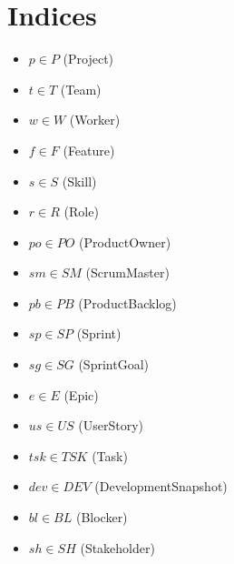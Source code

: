 \documentclass{article}
\begin{document}
\section{Indices}
\begin{itemize}
    \item $p \in P$ (Project)
    \item $t \in T$ (Team)
    \item $w \in W$ (Worker)
    \item $f \in F$ (Feature)
    \item $s \in S$ (Skill)
    \item $r \in R$ (Role)
    \item $po \in PO$ (ProductOwner)
    \item $sm \in SM$ (ScrumMaster)
    \item $pb \in PB$ (ProductBacklog)
    \item $sp \in SP$ (Sprint)
    \item $sg \in SG$ (SprintGoal)
    \item $e \in E$ (Epic)
    \item $us \in US$ (UserStory)
    \item $tsk \in TSK$ (Task)
    \item $dev \in DEV$ (DevelopmentSnapshot)
    \item $bl \in BL$ (Blocker)
    \item $sh \in SH$ (Stakeholder)
\end{itemize}
\end{document}
